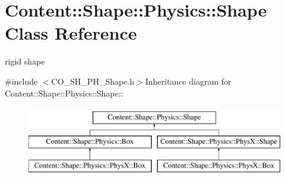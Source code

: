 \hypertarget{classContent_1_1Shape_1_1Physics_1_1Shape}{
\section{Content::Shape::Physics::Shape Class Reference}
\label{classContent_1_1Shape_1_1Physics_1_1Shape}
}


rigid shape  


{\ttfamily \#include $<$CO\_\-SH\_\-PH\_\-Shape.h$>$}Inheritance diagram for Content::Shape::Physics::Shape::\begin{figure}[H]
\begin{center}
\leavevmode
\includegraphics[height=3cm]{classContent_1_1Shape_1_1Physics_1_1Shape}
\end{center}
\end{figure}
